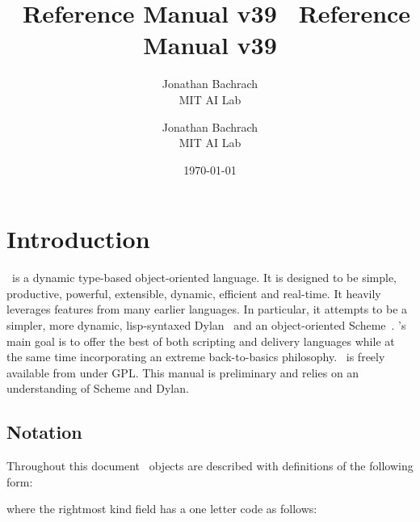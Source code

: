 \documentclass[twoside,twocolumn,9pt]{extarticle}
\begin{document}
\label{top_node}

\T\sloppy    %

\T\title{{\Huge \goo\ Reference Manual v39 }}
\T\author{{\huge Jonathan Bachrach} \\ {\Large MIT AI Lab}}
\W\title{{\huge \goo\ Reference Manual v39 }}
\W\author{{\Large Jonathan Bachrach} \\ {\Large MIT AI Lab}}
\date{\today}


\maketitle

\section{Introduction}

\goo\ is a dynamic type-based object-oriented language.  It is
designed to be simple, productive, powerful, extensible, dynamic,
efficient and real-time.  It heavily leverages features from many
earlier languages.  In particular, it attempts to be a simpler,
more dynamic, lisp-syntaxed Dylan~\cite{Shalit:1996} and an object-oriented 
Scheme~\cite{Kelsey:Clinger:Rees:hosc:1998}.
\goo's main goal is to offer the best of both scripting and
delivery languages while at the same time 
incorporating an extreme back-to-basics philosophy.
\goo\ is freely available from  under GPL.
This manual is preliminary and relies on an understanding
of Scheme and Dylan.

\subsection{Notation}

Throughout this document \goo\ objects are described with definitions
of the following form:

\begin{defs}
\end{defs}

where the rightmost kind field has a one letter code as follows:

\begin{defs}
\end{defs}
\end{document}
